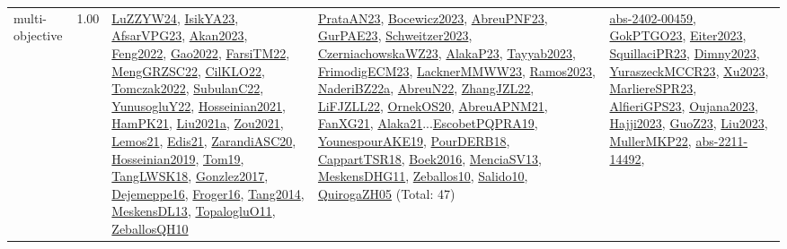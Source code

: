 {\begin{longtable}{p{3cm}r>{\raggedright\arraybackslash}p{6cm}>{\raggedright\arraybackslash}p{6cm}>{\raggedright\arraybackslash}p{8cm}}
\index{multi-objective}\index{Concepts!multi-objective}multi-objective &  1.00 & \hyperref[detail:LuZZYW24]{LuZZYW24}, \hyperref[detail:IsikYA23]{IsikYA23}, \hyperref[detail:AfsarVPG23]{AfsarVPG23}, \hyperref[detail:Akan2023]{Akan2023}, \hyperref[detail:Feng2022]{Feng2022}, \hyperref[detail:Gao2022]{Gao2022}, \hyperref[detail:FarsiTM22]{FarsiTM22}, \hyperref[detail:MengGRZSC22]{MengGRZSC22}, \hyperref[detail:CilKLO22]{CilKLO22}, \hyperref[detail:Tomczak2022]{Tomczak2022}, \hyperref[detail:SubulanC22]{SubulanC22}, \hyperref[detail:YunusogluY22]{YunusogluY22}, \hyperref[detail:Hosseinian2021]{Hosseinian2021}, \hyperref[detail:HamPK21]{HamPK21}, \hyperref[detail:Liu2021a]{Liu2021a}, \hyperref[detail:Zou2021]{Zou2021}, \hyperref[detail:Lemos21]{Lemos21}, \hyperref[detail:Edis21]{Edis21}, \hyperref[detail:ZarandiASC20]{ZarandiASC20}, \hyperref[detail:Hosseinian2019]{Hosseinian2019}, \hyperref[detail:Tom19]{Tom19}, \hyperref[detail:TangLWSK18]{TangLWSK18}, \hyperref[detail:Gonzlez2017]{Gonzlez2017}, \hyperref[detail:Dejemeppe16]{Dejemeppe16}, \hyperref[detail:Froger16]{Froger16}, \hyperref[detail:Tang2014]{Tang2014}, \hyperref[detail:MeskensDL13]{MeskensDL13}, \hyperref[detail:TopalogluO11]{TopalogluO11}, \hyperref[detail:ZeballosQH10]{ZeballosQH10} & \hyperref[detail:PrataAN23]{PrataAN23}, \hyperref[detail:Bocewicz2023]{Bocewicz2023}, \hyperref[detail:AbreuPNF23]{AbreuPNF23}, \hyperref[detail:GurPAE23]{GurPAE23}, \hyperref[detail:Schweitzer2023]{Schweitzer2023}, \hyperref[detail:CzerniachowskaWZ23]{CzerniachowskaWZ23}, \hyperref[detail:AlakaP23]{AlakaP23}, \hyperref[detail:Tayyab2023]{Tayyab2023}, \hyperref[detail:FrimodigECM23]{FrimodigECM23}, \hyperref[detail:LacknerMMWW23]{LacknerMMWW23}, \hyperref[detail:Ramos2023]{Ramos2023}, \hyperref[detail:NaderiBZ22a]{NaderiBZ22a}, \hyperref[detail:AbreuN22]{AbreuN22}, \hyperref[detail:ZhangJZL22]{ZhangJZL22}, \hyperref[detail:LiFJZLL22]{LiFJZLL22}, \hyperref[detail:OrnekOS20]{OrnekOS20}, \hyperref[detail:AbreuAPNM21]{AbreuAPNM21}, \hyperref[detail:FanXG21]{FanXG21}, \hyperref[detail:Alaka21]{Alaka21}...\hyperref[detail:EscobetPQPRA19]{EscobetPQPRA19}, \hyperref[detail:YounespourAKE19]{YounespourAKE19}, \hyperref[detail:PourDERB18]{PourDERB18}, \hyperref[detail:CappartTSR18]{CappartTSR18}, \hyperref[detail:Boek2016]{Boek2016}, \hyperref[detail:MenciaSV13]{MenciaSV13}, \hyperref[detail:MeskensDHG11]{MeskensDHG11}, \hyperref[detail:Zeballos10]{Zeballos10}, \hyperref[detail:Salido10]{Salido10}, \hyperref[detail:QuirogaZH05]{QuirogaZH05} (Total: 47) & \hyperref[detail:abs-2402-00459]{abs-2402-00459}, \hyperref[detail:GokPTGO23]{GokPTGO23}, \hyperref[detail:Eiter2023]{Eiter2023}, \hyperref[detail:SquillaciPR23]{SquillaciPR23}, \hyperref[detail:Dimny2023]{Dimny2023}, \hyperref[detail:YuraszeckMCCR23]{YuraszeckMCCR23}, \hyperref[detail:Xu2023]{Xu2023}, \hyperref[detail:MarliereSPR23]{MarliereSPR23}, \hyperref[detail:AlfieriGPS23]{AlfieriGPS23}, \hyperref[detail:Oujana2023]{Oujana2023}, \hyperref[detail:Hajji2023]{Hajji2023}, \hyperref[detail:GuoZ23]{GuoZ23}, \hyperref[detail:Liu2023]{Liu2023}, \hyperref[detail:MullerMKP22]{MullerMKP22}, \hyperref[detail:abs-2211-14492]{abs-2211-14492}, 
\end{longtable}}

